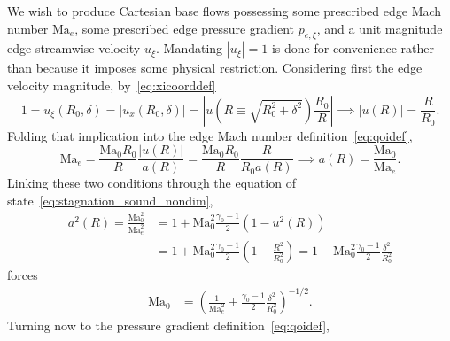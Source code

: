 \documentclass[letterpaper,11pt,nointlimits,reqno]{amsart}
\newcommand{\Mach}[1][]{\mbox{Ma}_{#1}}
\begin{document}
We wish to produce Cartesian base flows possessing some prescribed edge Mach
number $\Mach[e]{}$, some prescribed edge pressure gradient $p_{e,\xi}$, and a
unit magnitude edge streamwise velocity $u_\xi$.
%
Mandating $\left|u_\xi\right|=1$ is done for convenience rather than because it
imposes some physical restriction.
%
Considering first the edge velocity magnitude,
by~\eqref{eq:xicoorddef}
\begin{equation}
    1
    = u_\xi\!\left(R_0, \delta\right)
    = \left|u_x\!\left(R_0,\delta\right) \right|
    = \left|u  \!\left(R\equiv\sqrt{R_0^2+\delta^2}\right) \frac{R_0}{R} \right|
\implies
    \left|u\!\left(R\right)\right| = \frac{R}{R_0}
    \label{eq:matching_u}
.
\end{equation}
%
Folding that implication into the edge Mach number
definition~\eqref{eq:qoidef},
\begin{equation}
    \Mach[e]{}
    =
    \frac{\Mach[0]{} R_0}{R}
    \frac{\left|u\!\left(R\right)\right|}
         {      a\!\left(R\right)       }
    =
    \frac{\Mach[0]{} R_0}{R}
    \frac{R}{R_0 a\!\left(R\right)}
\implies
    a\!\left( R \right) = \frac{\Mach[0]}{\Mach[e]}
.
\end{equation}
%
Linking these two conditions through the equation of
state~\eqref{eq:stagnation_sound_nondim},
\begin{align}
    a^2\!\left(R\right)
    = \frac{\Mach[0]^2}{\Mach[e]^2}
   &= 1 + \Mach[0]^2\frac{\gamma_0-1}{2}\left(1-u^2\!\left(R\right)\right)
\\ &= 1 + \Mach[0]^2\frac{\gamma_0-1}{2}\left(1-\frac{R^2}{R_0^2}\right)
    = 1 - \Mach[0]^2\frac{\gamma_0-1}{2}\frac{\delta^2}{R_0^2}
\end{align}
forces
\begin{align}
    \Mach[0] &= \left(
        \frac{1}{\Mach[e]^2} + \frac{\gamma_0-1}{2}\frac{\delta^2}{R_0^2}
    \right)^{-1/2}
    \label{eq:matching_Ma0}
.
\end{align}
%
Turning now to the pressure gradient definition~\eqref{eq:qoidef},
\end{document}
